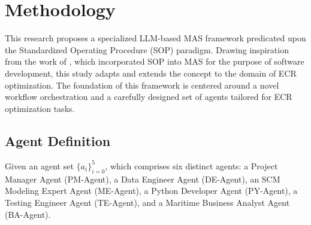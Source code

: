 \documentclass[preprint,12pt]{elsarticle}
\begin{document}
\section{Methodology}

This research proposes a specialized LLM-based MAS framework predicated upon the Standardized Operating Procedure (SOP) paradigm. Drawing inspiration from the work of \cite{hongMetaGPTMetaProgramming2024d}, which incorporated SOP into MAS for the purpose of software development, this study adapts and extends the concept to the domain of ECR optimization. The foundation of this framework is centered around a novel workflow orchestration and a carefully designed set of agents tailored for ECR optimization tasks.

\subsection{Agent Definition}
Given an agent set $\{a_i\}_{i=0}^5$, which comprises six distinct agents: a Project Manager Agent (PM-Agent), a Data Engineer Agent (DE-Agent), an SCM Modeling Expert Agent (ME-Agent), a Python Developer Agent (PY-Agent), a Testing Engineer Agent (TE-Agent), and a Maritime Business Analyst Agent (BA-Agent).
\end{document}
